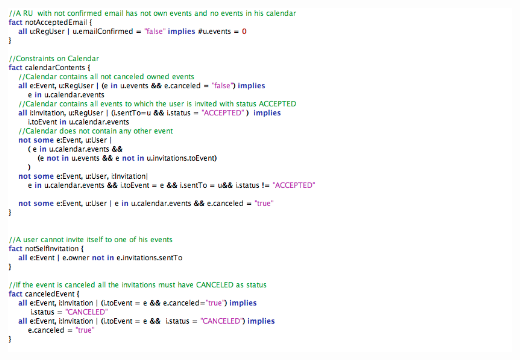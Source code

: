 \documentclass[12pt]{book}
\begin{document}
\includegraphics[width=19cm,height=21cm]{Alloy7}\\
\newpage
\end{document}
